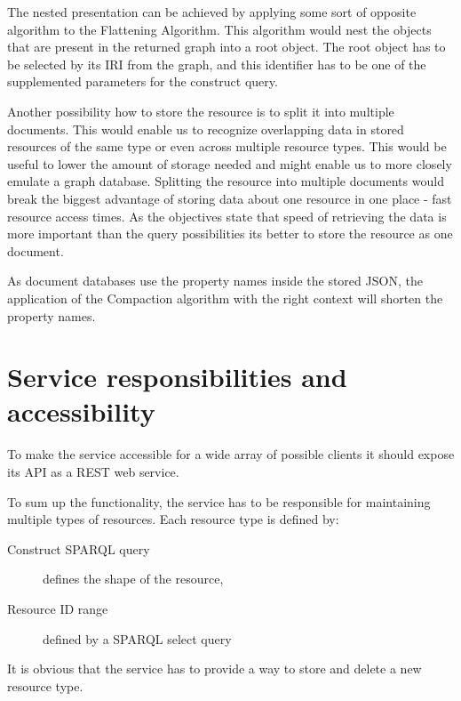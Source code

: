 The nested presentation can be achieved by applying some sort of opposite algorithm to the Flattening Algorithm. This algorithm would nest the objects that are present in the returned graph into a root object. The root object has to be selected by its IRI from the graph, and this identifier has to be one of the supplemented parameters for the construct query.

Another possibility how to store the resource is to split it into multiple documents. This would enable us to recognize overlapping data in stored resources of the same type or even across multiple resource types. This would be useful to lower the amount of storage needed and might enable us to more closely emulate a graph database. Splitting the resource into multiple documents would break the biggest advantage of storing data about one resource in one place - fast resource access times. As the objectives state that speed of retrieving the data is more important than the query possibilities its better to store the resource as one document.


As document databases use the property names inside the stored JSON, the application of the Compaction algorithm with the right context will shorten the property names.


\section{Service responsibilities and accessibility}
To make the service accessible for a wide array of possible clients it should expose its API as a REST web service.

To sum up the functionality, the service has to be responsible for maintaining multiple types of resources.
Each resource type is defined by:
\begin{description}
	\item[Construct SPARQL query] defines the shape of the resource, 
	\item[Resource ID range] defined by a SPARQL select query
\end{description}
It is obvious that the service has to provide a way to store and delete a new resource type. 

